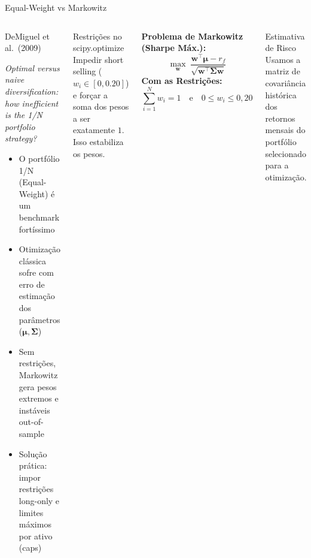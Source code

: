 \documentclass[aspectratio=169,12pt]{beamer}
\begin{document}
\begin{frame}[fragile]{Equal-Weight vs Markowitz}
\begin{columns}[T]
\begin{block}{DeMiguel et al.\ (2009)}

\textit{Optimal versus naive diversification: how inefficient is the 1/N portfolio strategy?}
\vspace{.3em}
\begin{itemize}
  \item O portfólio 1/N (Equal-Weight) é um benchmark fortíssimo
  \item Otimização clássica sofre com erro de estimação dos parâmetros ($\boldsymbol{\mu}, \boldsymbol{\Sigma}$)
  \item Sem restrições, Markowitz gera pesos extremos e instáveis out-of-sample
  \item Solução prática: impor restrições long-only e limites máximos por ativo (caps)
\end{itemize}
\end{block}\vspace{.3em}
\begin{alertblock}{Restrições no scipy.optimize}
Impedir short selling ($w_i \in [0, 0.20]$) e forçar a soma dos pesos a ser exatamente $1$. Isso estabiliza os pesos.
\end{alertblock}

\textbf{Problema de Markowitz (Sharpe Máx.):}
\[
\max_{\mathbf{w}}\; \frac{\mathbf{w}^\top\boldsymbol{\mu} - r_f}{\sqrt{\mathbf{w}^\top\boldsymbol{\Sigma}\mathbf{w}}}
\]
\vspace{.1em}
\textbf{Com as Restrições:}
\[
\sum_{i=1}^N w_i = 1 \quad \text{e} \quad 0 \leq w_i \leq 0{,}20
\]

\vspace{.3em}
\begin{exampleblock}{Estimativa de Risco}
Usamos a matriz de covariância histórica dos retornos mensais do portfólio selecionado para a otimização.
\end{exampleblock}
\end{columns}
\end{frame}
\end{document}
